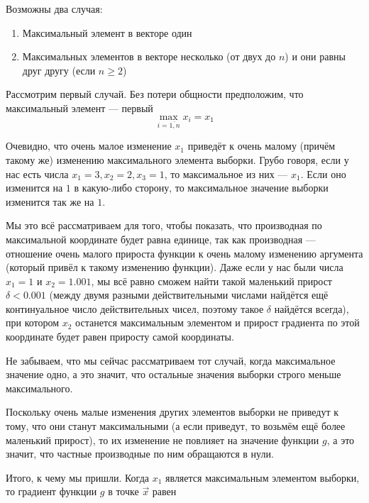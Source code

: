Возможны два случая:
\begin{enumerate}
  \item Максимальный элемент в векторе один
  \item Максимальных элементов в векторе несколько
      (от двух до $n$) и они равны друг другу (если $n \ge 2$)
\end{enumerate}

Рассмотрим первый случай. Без потери общности предположим,
что максимальный элемент --- первый
$$\max_{i= \overline{1,n}} x_i = x_1$$

Очевидно, что очень малое изменение $x_1$ приведёт к
очень малому (причём такому же) изменению максимального элемента выборки.
Грубо говоря, если у нас есть числа $x_1 = 3, x_2 = 2, x_3 = 1$,
то максимальное из них --- $x_1$. Если оно изменится на $1$
в какую-либо сторону, то максимальное значение выборки изменится
так же на $1$.

Мы это всё рассматриваем для того, чтобы показать,
что производная по максимальной координате будет равна единице,
так как производная --- отношение очень малого прироста функции
к очень малому изменению аргумента (который привёл к такому изменению функции).
Даже если у нас были числа $x_1 = 1$ и $x_2 = 1.001$,
мы всё равно сможем найти такой маленький прирост $\delta < 0.001$
(между двумя разными действительными числами найдётся ещё континуальное число
действительных чисел, поэтому такое $\delta$ найдётся всегда),
при котором $x_2$ останется максимальным элементом и прирост градиента
по этой координате будет равен приросту самой координаты.

Не забываем, что мы сейчас рассматриваем тот случай,
когда максимальное значение одно, а это значит,
что остальные значения выборки строго меньше максимального.

Поскольку очень малые изменения других элементов выборки не приведут к тому,
что они станут максимальными (а если приведут, то возьмём ещё более
маленький прирост), то их изменение не повлияет на значение функции $g$,
а это значит, что частные производные по ним обращаются в нули.

Итого, к чему мы пришли.
Когда $x_1$ является максимальным элементом выборки,
то градиент функции $g$ в точке $\vec{x}$ равен
$$\vec{\nabla} \cdot g\left( \vec{x} \right)
  = \frac{\partial g}{\partial x_1} \cdot \vec{e_1}
      + \frac{\partial g}{\partial x_2} \cdot \vec{e_2}
      + \cdots
      + \frac{\partial g}{\partial x_n} \cdot \vec{e_n}
  = \vec{e_1} + 0 + \cdots + 0 = \vec{e_1}$$

